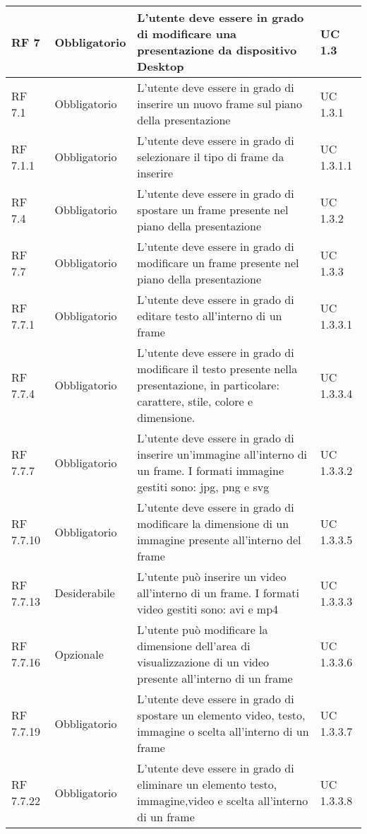 {\begin{longtable} [c]{| p{2.5cm} | p{2.5cm} | p{6cm} |p{2.5cm}|}
		RF 7 & Obbligatorio & L'utente deve essere in grado di modificare una presentazione da dispositivo Desktop\ped{g} & UC 1.3\\						
		\hline
		RF 7.1 & Obbligatorio & L'utente deve essere in grado di inserire un nuovo frame\ped{g} sul piano della presentazione\ped{g} & UC 1.3.1\\
		\hline
		RF 7.1.1 & Obbligatorio & L'utente deve essere in grado di selezionare il tipo di frame\ped{g} da inserire & UC 1.3.1.1\\
		\hline
		RF 7.4 & Obbligatorio & L'utente deve essere in grado di spostare un frame\ped{g} presente nel piano della presentazione\ped{g} & UC 1.3.2\\
		\hline
		RF 7.7 & Obbligatorio & L'utente deve essere in grado di modificare un frame\ped{g} presente nel piano della presentazione\ped{g} & UC 1.3.3\\
		\hline
		RF 7.7.1 & Obbligatorio & L'utente deve essere in grado di editare testo all'interno di un frame\ped{g} & UC 1.3.3.1\\
		\hline
		RF 7.7.4 & Obbligatorio & L'utente deve essere in grado di modificare il testo presente nella presentazione, in particolare: carattere, stile, colore e dimensione. & UC 1.3.3.4\\
		\hline
		RF 7.7.7 & Obbligatorio & L'utente deve essere in grado di inserire un'immagine all'interno di un frame\ped{g}. I formati immagine gestiti sono: jpg, png e svg & UC 1.3.3.2\\
		\hline
		RF 7.7.10 & Obbligatorio & L'utente deve essere in grado di modificare la dimensione di un immagine presente all'interno del frame\ped{g} & UC 1.3.3.5\\
		\hline
		RF 7.7.13 & Desiderabile & L'utente può inserire un video all'interno di un frame\ped{g}. I formati video gestiti sono: avi e mp4 & UC 1.3.3.3\\
		\hline
		RF 7.7.16 & Opzionale & L'utente può modificare la dimensione dell’area di visualizzazione di un video presente all'interno di un frame\ped{g}  & UC 1.3.3.6\\
		\hline
		RF 7.7.19 & Obbligatorio & L'utente deve essere in grado di spostare un elemento video, testo, immagine o scelta all'interno di un frame\ped{g} & UC 1.3.3.7\\
		\hline
		RF 7.7.22 & Obbligatorio & L'utente deve essere in grado di eliminare un elemento testo, immagine,video e scelta all'interno di un frame\ped{g} & UC 1.3.3.8\\
		\hline

\end{longtable}}
